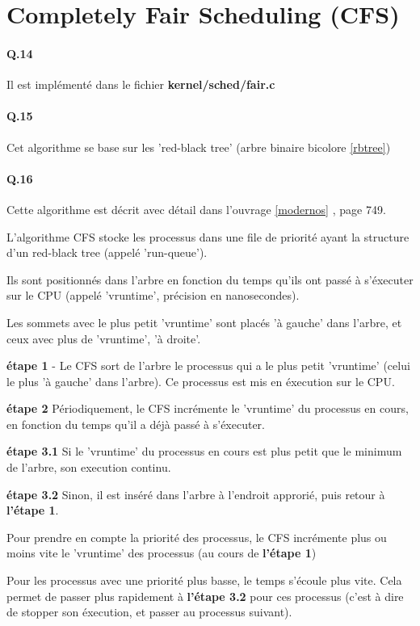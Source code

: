\documentclass[10pt]{article}
\begin{document}
\newpage
\section{Completely Fair Scheduling (CFS)}
  \paragraph{Q.14} Il est implémenté dans le fichier \textbf{kernel/sched/fair.c}

  \paragraph{Q.15} Cet algorithme se base sur les 'red-black tree' (arbre binaire bicolore \ref{rbtree})

  \paragraph{Q.16} Cette algorithme est décrit avec détail dans l'ouvrage \ref{modernos} , page 749.
  
  L'algorithme CFS stocke les processus dans une file de priorité ayant la structure d'un red-black tree (appelé 'run-queue').
  
  Ils sont positionnés dans l'arbre en fonction du temps qu'ils ont passé à s'éxecuter sur le CPU (appelé 'vruntime', précision en nanosecondes).
  
  Les sommets avec le plus petit 'vruntime' sont placés 'à gauche' dans l'arbre, et ceux avec plus de 'vruntime', 'à droite'.
  
  \textbf{étape 1} - Le CFS sort de l'arbre le processus qui a le plus petit 'vruntime' (celui le plus 'à gauche' dans l'arbre).
  Ce processus est mis en éxecution sur le CPU.

  \textbf{étape 2} Périodiquement, le CFS incrémente le 'vruntime' du processus en cours, en fonction du temps
  qu'il a déjà passé à s'éxecuter.
  
  \textbf{étape 3.1} Si le 'vruntime' du processus en cours est plus petit que le minimum de l'arbre, son execution continu.
  
  \textbf{étape 3.2} Sinon, il est inséré dans l'arbre à l'endroit approrié, puis retour à \textbf{l'étape 1}.
  
  Pour prendre en compte la priorité des processus, le CFS incrémente plus ou moins
  vite le 'vruntime' des processus (au cours de \textbf{l'étape 1})
  
  Pour les processus avec une priorité plus basse, le temps s'écoule plus vite.
  Cela permet de passer plus rapidement à \textbf{l'étape 3.2} pour ces processus (c'est à dire de stopper son éxecution, et passer au processus suivant).
  
\end{document}
